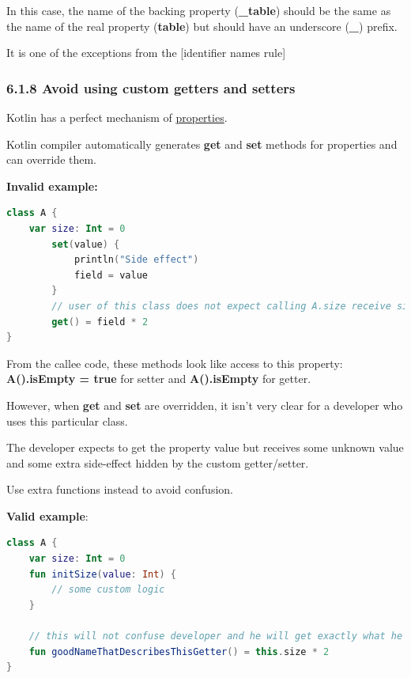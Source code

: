 In this case, the name of the backing property (\textbf{\_table}) should be the same as the name of the real property (\textbf{table}) but should have an underscore (\textbf{\_}) prefix.

It is one of the exceptions from the [identifier names rule]



\subsubsection*{\textbf{6.1.8 Avoid using custom getters and setters}}
\leavevmode\newline

\label{sec:6.1.8}

Kotlin has a perfect mechanism of \href{https://kotlinlang.org/docs/reference/properties.html#properties-and-fields}{properties}.

Kotlin compiler automatically generates \textbf{get} and \textbf{set} methods for properties and can override them.



\textbf{Invalid example:}

\begin{lstlisting}[language=Kotlin]
class A {
    var size: Int = 0
        set(value) {
            println("Side effect")
            field = value
        }
        // user of this class does not expect calling A.size receive size * 2 
        get() = field * 2
}
\end{lstlisting}


From the callee code, these methods look like access to this property: \textbf{A().isEmpty = true} for setter and \textbf{A().isEmpty} for getter.



However, when \textbf{get} and \textbf{set} are overridden, it  isn't very clear for a developer who uses this particular class. 

The developer expects to get the property value but receives some unknown value and some extra side-effect hidden by the custom getter/setter. 

Use extra functions instead to avoid confusion.







\textbf{Valid example}:

\begin{lstlisting}[language=Kotlin]
class A {
    var size: Int = 0
    fun initSize(value: Int) {
        // some custom logic
    }
    
    // this will not confuse developer and he will get exactly what he expects    
    fun goodNameThatDescribesThisGetter() = this.size * 2
}
\end{lstlisting}


